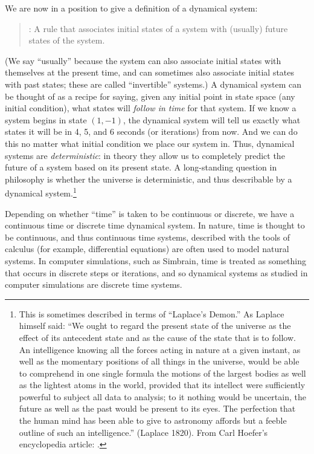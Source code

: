 We are now in a position to give a definition of a dynamical system:
\begin{quote}
: A rule that associates initial states of a system with (usually) future states of the system.
\end{quote}
(We say ``usually'' because the system can also associate initial states with themselves at the present time, and can sometimes also associate initial states with past states; these are called ``invertible'' systems.)
A dynamical system can be thought of as a recipe for saying, given any initial
point in state space (any initial condition), what states will {\em follow in
time} for that system. If we know a system begins in state $(1,-1)$, the
dynamical system will tell us exactly what states it will be in 4, 5, and 6
seconds (or iterations) from now. And we can do this no matter what initial
condition we place our system in. Thus, dynamical systems are \emph{deterministic}: in
theory they allow us to completely predict the future of a system based on its
present state. A long-standing question in philosophy is whether the universe is deterministic, and thus describable by a dynamical system.\footnote{This is sometimes described in terms of ``Laplace's Demon.''   As Laplace himself said: ``We ought to regard the present state of the universe as the effect of its antecedent state and as the cause of the state that is to follow. An intelligence knowing all the forces acting in nature at a given instant, as well as the momentary positions of all things in the universe, would be able to comprehend in one single formula the motions of the largest bodies as well as the lightest atoms in the world, provided that its intellect were sufficiently powerful to subject all data to analysis; to it nothing would be uncertain, the future as well as the past would be present to its eyes. The perfection that the human mind has been able to give to astronomy affords but a feeble outline of such an intelligence.'' (Laplace 1820). From Carl Hoefer's encyclopedia article: .}

Depending on whether ``time'' is taken to be continuous or discrete, we have a continuous time or discrete time dynamical system. In nature, time is thought to be continuous, and thus continuous time systems, described with the tools of calculus (for example, differential equations) are often used to model natural systems. In computer simulations, such as Simbrain, time is treated as something that occurs in discrete steps or iterations, and so dynamical systems as studied in computer simulations are discrete time systems.


